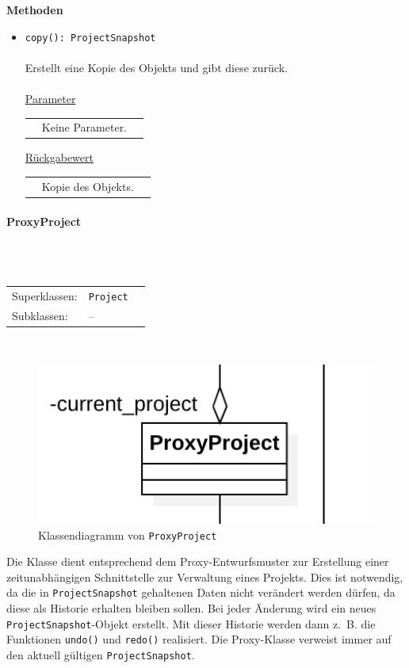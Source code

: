 \documentclass{article}
\newcommand{\classheader}[2][]{\paragraph{#2}
\mbox{}\textit{#1}\\\\}
\begin{document}
\textbf{Methoden}
\begin{itemize}\setlength\itemsep{3em}
\item \texttt{copy(): ProjectSnapshot}\\\\
Erstellt eine Kopie des Objekts und gibt diese zurück.
\\\\
\underline{Parameter}\\
\begin{tabular}{lll}
 & Keine Parameter.
\end{tabular}

\underline{Rückgabewert}\\
\begin{tabular}{lll}
 & Kopie des Objekts.\\
\end{tabular}
\end{itemize}

\newpage
\classheader{ProxyProject}\label{cls:ProxyProject}
\begin{tabular}{lll}
 Superklassen: & \texttt{Project}\\
 Subklassen: & --
\end{tabular}\\
\begin{figure}[H]%
    \centering
    \includegraphics[width=13cm]{entwurf/Entwurf_dokument/img/cls/model/ProxyProject.png}
    \caption{Klassendiagramm von \texttt{ProxyProject}}
\end{figure}

Die Klasse dient entsprechend dem Proxy-Entwurfsmuster zur Erstellung einer zeitunabhängigen Schnittstelle zur Verwaltung eines Projekts. Dies ist notwendig, da die in \texttt{ProjectSnapshot} gehaltenen Daten nicht verändert werden dürfen, da diese als Historie erhalten bleiben sollen. Bei jeder Änderung wird ein neues \texttt{ProjectSnapshot}-Objekt erstellt. Mit dieser Historie werden dann z.~B. die Funktionen \texttt{undo()} und \texttt{redo()} realisiert. Die Proxy-Klasse verweist immer auf den aktuell gültigen \texttt{ProjectSnapshot}.
\\\\
\end{document}
